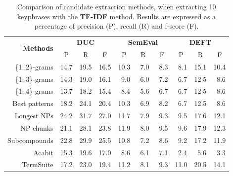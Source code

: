     \begin{table}[h]
      \centering
      \begin{tabular}{rccccccccc}
        \toprule
        \multirow{2}{*}[-2pt]{\textbf{Methods}} & \multicolumn{3}{c}{\textbf{DUC}} & \multicolumn{3}{c}{\textbf{SemEval}} & \multicolumn{3}{c}{\textbf{DEFT}}\\
        \cmidrule(r){2-4}\cmidrule(lr){5-7}\cmidrule(l){8-10}
        & P & R & F & P & R & F & P & R & F\\
        \midrule
        \{1..2\}-grams & 14.7 & 19.5 & 16.5 & 10.3 & $~~$7.0 & $~~$8.3 & $~~$8.1 & 15.1 & 10.4\\
        \{1..3\}-grams & 14.3 & 19.0 & 16.1 & $~~$9.0 & $~~$6.0 & $~~$7.2 & $~~$6.7 & 12.5 & $~~$8.6\\
        \{1..4\}-grams & 13.7 & 18.2 & 15.4 & $~~$8.4 & $~~$5.6 & $~~$6.7 & $~~$6.7 & 12.5 & $~~$8.6\\
        Best patterns & 18.2 & 24.1 & 20.4 & 10.3 & $~~$6.9 & $~~$8.2 & $~~$6.7 & 12.5 & $~~$8.6\\
        Longest NPs & 24.2 & 31.7 & 27.0 & 11.7 & $~~$7.9 & $~~$9.3 & $~~$9.5 & 17.6 & 12.1\\
        NP chunks & 21.1 & 28.1 & 23.8 & 11.9 & $~~$8.0 & $~~$9.5 & $~~$9.6 & 17.9 & 12.3\\
        Subcompounds & 22.8 & 29.9 & 25.5 & 10.8 & $~~$7.2 & $~~$8.6 & $~~$9.2 & 17.2 & 11.9\\
        Acabit & 15.3 & 19.6 & 17.0 & $~~$8.6 & $~~$6.1 & $~~$7.1 & $~~$2.4 & $~~$5.6 & $~~$3.3\\
        TermSuite & 17.2 & 23.0 & 19.4 & 11.2 & $~~$8.1 & $~~$9.3 & 11.0 & 20.5 & 14.1\\
        \bottomrule
      \end{tabular}
      \caption{Comparison of candidate extraction methods, when extracting 10
               keyphrases with the \textbf{TF-IDF} method. Results are expressed
               as a percentage of precision (P), recall (R) and f-score (F).
               \label{tab:keyphrase_extraction_results}}
    \end{table}

